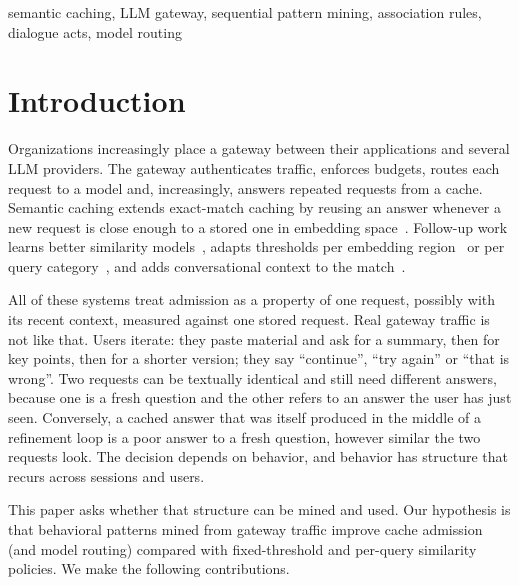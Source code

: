 \documentclass[conference]{IEEEtran}
\begin{document}
\begin{IEEEkeywords}
semantic caching, LLM gateway, sequential pattern mining, association rules, dialogue acts, model routing
\end{IEEEkeywords}

\section{Introduction}
Organizations increasingly place a gateway between their applications and several LLM providers. The gateway authenticates traffic, enforces budgets, routes each request to a model and, increasingly, answers repeated requests from a cache. Semantic caching extends exact-match caching by reusing an answer whenever a new request is close enough to a stored one in embedding space~\cite{bang2023gptcache}. Follow-up work learns better similarity models~\cite{gill2025meancache}, adapts thresholds per embedding region~\cite{schroeder2025vectorq} or per query category~\cite{wang2025category}, and adds conversational context to the match~\cite{yan2025contextcache}.

All of these systems treat admission as a property of one request, possibly with its recent context, measured against one stored request. Real gateway traffic is not like that. Users iterate: they paste material and ask for a summary, then for key points, then for a shorter version; they say ``continue'', ``try again'' or ``that is wrong''. Two requests can be textually identical and still need different answers, because one is a fresh question and the other refers to an answer the user has just seen. Conversely, a cached answer that was itself produced in the middle of a refinement loop is a poor answer to a fresh question, however similar the two requests look. The decision depends on behavior, and behavior has structure that recurs across sessions and users.

This paper asks whether that structure can be mined and used. Our hypothesis is that behavioral patterns mined from gateway traffic improve cache admission (and model routing) compared with fixed-threshold and per-query similarity policies. We make the following contributions.
\end{document}
